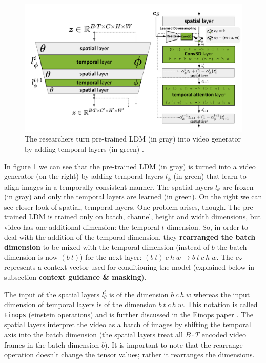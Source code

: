 \begin{figure}
    \centering
    \includegraphics[width=1\textwidth]{images/video_ldm/temporal_layers.png}
    \caption{The researchers turn pre-trained LDM (in gray) into video generator by adding temporal layers (in green) \cite{video_ldm}.}
    \label{fig:video_ldm_spatial_temporal_mixing_layers}
\end{figure}

In figure \ref{fig:video_ldm_spatial_temporal_mixing_layers} we can see that the pre-trained LDM (in gray) is turned into a video generator (on the right) by adding temporal layers $l_\phi$ (in green) that learn to align images in a temporally consistent manner. The spatial layers $l_\theta$ are frozen (in gray) and only the temporal layers are learned (in green). On the right we can see closer look of spatial, temporal layers. One problem arises, though. The pre-trained LDM is trained only on batch, channel, height and width dimensions, but video has one additional dimension: the temporal $t$ dimension. So, in order to deal with the addition of the temporal dimension, they \textbf{rearranged the batch dimension} to be mixed with the temporal dimension (instead of $b$ the batch dimension is now $(b\ t)$) for the next layer: $(b\ t)\ c\ h\ w \rightarrow b\ t\ c\ h\ w$. The $c_S$ represents a context vector used for conditioning the model (explained below in subsection \textbf{context guidance \& masking}).

The input of the spatial layers $l_\theta^i$ is of the dimension $b\ c\ h\ w$ whereas the input dimension of temporal layers is of the dimension $b\ t\ c\ h\ w$. This notation is called \texttt{Einops} (einstein operations) and is further discussed in the Einops paper \cite{einops}. The spatial layers interpret the video as a batch of images by shifting the temporal axis into the batch dimension (the spatial layers treat all $B \cdot T$ encoded video frames in the batch dimension $b$). It is important to note that the rearrange operation doesn't change the tensor values; rather it rearranges the dimensions.

